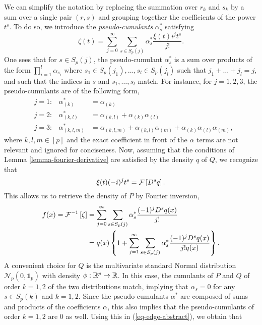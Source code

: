 We can simplify the notation by replacing the summation over $r_k$ and $s_k$ by a sum over a single pair $(r, s)$ and grouping together the coefficients of the power $t^s$. To do so, we introduce the \textit{pseudo-cumulants} $\alpha^*_s$ satisfying
\begin{equation} \label{eq-char-expansion}
    \zeta(t) = 
    \sum_{j=0}^\infty 
    \sum_{s \in S_p(j)}
    \alpha^*_s \frac{\xi(t) i^{j} t^{s}}{j!}.
\end{equation}
One sees that for $s \in S_p(j)$, the pseudo-cumulant $\alpha^*_s$ is a sum over products of the form $ \prod_{i=1}^l \alpha_{s_i}$ where $s_1 \in S_p(j_1), \ldots, s_l \in S_p(j_l)$ such that $j_1 + \ldots + j_l = j$, and such that the indices in $s$ and $s_1, \ldots, s_l$ match. For instance, for $j = 1, 2, 3$, the pseudo-cumulants are of the following form,
\begin{align*}
    &j = 1:& \alpha^*_{(k)} &= \alpha_{(k)} \\
    &j = 2:&\alpha^*_{(k, l)} &= \alpha_{(k, l)} + \alpha_{(k)}\alpha_{(l)}\\
    &j = 3:&\alpha^*_{(k, l, m)} &= \alpha_{(k, l, m)} + \alpha_{(k, l)}\alpha_{(m)} + \alpha_{(k)}\alpha_{(l)}\alpha_{(m)},
\end{align*}
where $k,l,m \in [p]$ and the exact coefficient in front of the $\alpha$ terms are not relevant and ignored for conciseness. Now, assuming that the conditions of Lemma \ref{lemma-fourier-derivative} are satisfied by the density $q$ of $Q$, we recognize that
\begin{equation*}
    \xi(t) (-i)^{j} t^s  = \mathcal{F} \left[ D^s q \right].
\end{equation*}
This allows us to retrieve the density of $P$ by Fourier inversion,
\begin{align}\label{eq-edge-abstract}
    f(x) = \mathcal{F}^{-1}\left[\zeta\right] &= 
    \sum_{j=0}^\infty 
    \sum_{s \in S_p(j)}
    \alpha^*_s \frac{(-1)^j D^s q(x)}{j!}\nonumber\\
    &= 
    q(x) \left\{ 1 + \sum_{j=1}^\infty 
    \sum_{s \in S_p(j)}
    \alpha^*_s \frac{(-1)^j D^s q(x)}{j! q(x)}\right\}.
\end{align}
A convenient choice for $Q$ is the multivariate standard Normal distribution $\mathcal{N}_p(0, \mathbb{1}_p)$ with density $\phi : {\mathbb{R}^p} \rightarrow \mathbb{R}$. In this case, the cumulants of $P$ and $Q$ of order $k=1,2$ of the two distributions match, implying that $\alpha_s = 0$ for any $s \in S_p(k)$ and $k=1,2$. Since the pseudo-cumulants $\alpha^*$ are composed of sums and products of the coefficients $\alpha$, this also implies that the pseudo-cumulants of order $k=1,2$ are 0 as well. Using this in (\ref{eq-edge-abstract}), we obtain that
